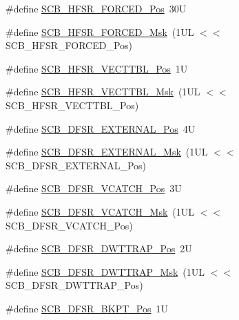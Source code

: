 \begin{DoxyCompactItemize}
\item 
\#define \mbox{\hyperlink{group___c_m_s_i_s___s_c_b_gab361e54183a378474cb419ae2a55d6f4}{S\+C\+B\+\_\+\+H\+F\+S\+R\+\_\+\+F\+O\+R\+C\+E\+D\+\_\+\+Pos}}~30U
\item 
\#define \mbox{\hyperlink{group___c_m_s_i_s___s_c_b_ga6560d97ed043bc01152a7247bafa3157}{S\+C\+B\+\_\+\+H\+F\+S\+R\+\_\+\+F\+O\+R\+C\+E\+D\+\_\+\+Msk}}~(1\+U\+L $<$$<$ S\+C\+B\+\_\+\+H\+F\+S\+R\+\_\+\+F\+O\+R\+C\+E\+D\+\_\+\+Pos)
\item 
\#define \mbox{\hyperlink{group___c_m_s_i_s___s_c_b_ga77993da8de35adea7bda6a4475f036ab}{S\+C\+B\+\_\+\+H\+F\+S\+R\+\_\+\+V\+E\+C\+T\+T\+B\+L\+\_\+\+Pos}}~1U
\item 
\#define \mbox{\hyperlink{group___c_m_s_i_s___s_c_b_gaac5e289211d0a63fe879a9691cb9e1a9}{S\+C\+B\+\_\+\+H\+F\+S\+R\+\_\+\+V\+E\+C\+T\+T\+B\+L\+\_\+\+Msk}}~(1\+U\+L $<$$<$ S\+C\+B\+\_\+\+H\+F\+S\+R\+\_\+\+V\+E\+C\+T\+T\+B\+L\+\_\+\+Pos)
\item 
\#define \mbox{\hyperlink{group___c_m_s_i_s___s_c_b_ga13f502fb5ac673df9c287488c40b0c1d}{S\+C\+B\+\_\+\+D\+F\+S\+R\+\_\+\+E\+X\+T\+E\+R\+N\+A\+L\+\_\+\+Pos}}~4U
\item 
\#define \mbox{\hyperlink{group___c_m_s_i_s___s_c_b_ga3cba2ec1f588ce0b10b191d6b0d23399}{S\+C\+B\+\_\+\+D\+F\+S\+R\+\_\+\+E\+X\+T\+E\+R\+N\+A\+L\+\_\+\+Msk}}~(1\+U\+L $<$$<$ S\+C\+B\+\_\+\+D\+F\+S\+R\+\_\+\+E\+X\+T\+E\+R\+N\+A\+L\+\_\+\+Pos)
\item 
\#define \mbox{\hyperlink{group___c_m_s_i_s___s_c_b_gad02d3eaf062ac184c18a7889c9b6de57}{S\+C\+B\+\_\+\+D\+F\+S\+R\+\_\+\+V\+C\+A\+T\+C\+H\+\_\+\+Pos}}~3U
\item 
\#define \mbox{\hyperlink{group___c_m_s_i_s___s_c_b_gacbb931575c07b324ec793775b7c44d05}{S\+C\+B\+\_\+\+D\+F\+S\+R\+\_\+\+V\+C\+A\+T\+C\+H\+\_\+\+Msk}}~(1\+U\+L $<$$<$ S\+C\+B\+\_\+\+D\+F\+S\+R\+\_\+\+V\+C\+A\+T\+C\+H\+\_\+\+Pos)
\item 
\#define \mbox{\hyperlink{group___c_m_s_i_s___s_c_b_gaccf82364c6d0ed7206f1084277b7cc61}{S\+C\+B\+\_\+\+D\+F\+S\+R\+\_\+\+D\+W\+T\+T\+R\+A\+P\+\_\+\+Pos}}~2U
\item 
\#define \mbox{\hyperlink{group___c_m_s_i_s___s_c_b_ga3f7384b8a761704655fd45396a305663}{S\+C\+B\+\_\+\+D\+F\+S\+R\+\_\+\+D\+W\+T\+T\+R\+A\+P\+\_\+\+Msk}}~(1\+U\+L $<$$<$ S\+C\+B\+\_\+\+D\+F\+S\+R\+\_\+\+D\+W\+T\+T\+R\+A\+P\+\_\+\+Pos)
\item 
\#define \mbox{\hyperlink{group___c_m_s_i_s___s_c_b_gaf28fdce48655f0dcefb383aebf26b050}{S\+C\+B\+\_\+\+D\+F\+S\+R\+\_\+\+B\+K\+P\+T\+\_\+\+Pos}}~1U
$$
\end{DoxyCompactItemize}
